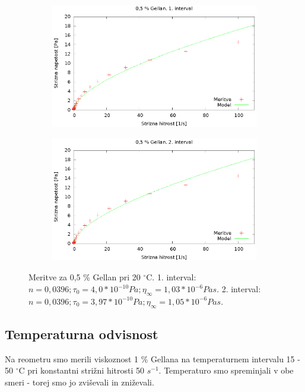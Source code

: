 \documentclass{article}
\begin{document}
\begin{figure}
	\centering
	\begin{subfigure}[b]{0.4\textwidth}
	       \includegraphics[width=\textwidth]{tok_gel3.eps}
	   \end{subfigure}
	   \begin{subfigure}[b]{0.4\textwidth}
	       \includegraphics[width=\textwidth]{tok_gel4.eps}
	   \end{subfigure}
	\caption{Meritve za 0,5 \% Gellan pri 20 $^\circ$C. 1. interval: $n = 0,0396; \tau_0 = 4,0*10^{-10} Pa; \eta_\infty = 1,03*10^{-6} Pa s$. 2. interval: $n = 0,0396; \tau_0 = 3,97*10^{-10} Pa; \eta_\infty = 1,05*10^{-6} Pa s$.}
	\label{fig:tok_gel2}
\end{figure}

\subsection{Temperaturna odvisnost}
Na reometru smo merili viskoznost 1 \% Gellana na temperaturnem intervalu 15 - 50 $^\circ$C pri konstantni strižni hitrosti 50 $s^{-1}$. Temperaturo smo spreminjali v obe smeri - torej smo jo zviševali in zniževali.
\end{document}

